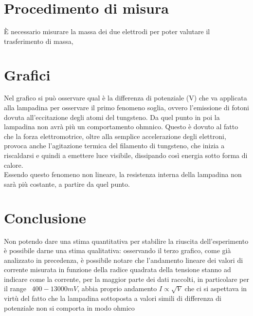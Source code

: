 \documentclass[10pt,twocolumn]{article}
\begin{document}
\section{Procedimento di misura}
È necessario misurare la massa dei due elettrodi per poter valutare il trasferimento di massa, 

\section{Grafici}
\begin{figure}[H] %
  \centering
\end{figure}
Nel grafico si può osservare qual è la differenza di potenziale (V) che va applicata alla lampadina per osservare il primo fenomeno soglia, ovvero l'emissione di fotoni dovuta all'eccitazione degli atomi del tungsteno.
Da quel punto in poi la lampadina non avrà più un comportamento ohmnico. Questo è dovuto al fatto che la forza elettromotrice, oltre alla semplice accelerazione degli elettroni, provoca anche l'agitazione termica del filamento di tungsteno, che inizia a riscaldarsi e quindi a emettere luce visibile, dissipando così energia sotto forma di calore. \\
Essendo questo fenomeno non lineare, la resistenza interna della lampadina non sarà più costante, a partire da quel punto. 


\section{Conclusione}
Non potendo dare una stima quantitativa per stabilire la riuscita
 dell'esperimento è possibile darne una stima qualitativa: osservando 
 il terzo grafico, come già analizzato in precedenza,
  è possibile notare che l'andamento lineare dei valori di corrente misurata in 
  funzione della radice quadrata della tensione stanno ad indicare come la corrente, 
  per la maggior parte dei dati raccolti, in particolare per il range  $400-13000mV$, 
  abbia proprio andamento $I \propto \sqrt{V}$ che ci si aspettava in virtù del fatto
   che la lampadina sottoposta a valori simili di differenza di potenziale non si comporta in modo ohmico
\end{document}
